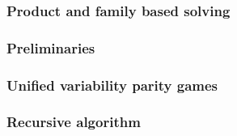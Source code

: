 \subsubsection{Product and family based solving}


\subsubsection{Preliminaries}


\subsubsection{Unified variability parity games}
\label{sec_unified_pg}


\subsubsection{Recursive algorithm}
